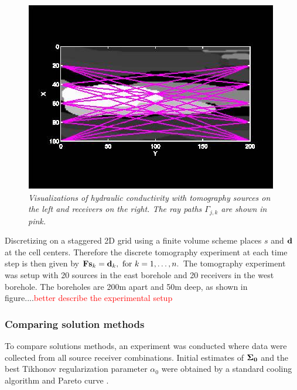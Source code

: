 \documentclass[12pt]{article}
\newcommand {\bfd}   { {\bf d} }
\newcommand {\bfs}   { {\bf s} }
\newcommand{\alert}[1] {\textcolor{red}{#1}}
\newcommand{\bF}  { {\bf F} }      %
\newcommand{\Sigh}{\bf \Sigma}
\begin{document}
\begin{figure}[h!]
	\begin{center}
		\iwidth=80mm
			\includegraphics[width=\iwidth]{figures/tomo.jpg}
	\end{center}
	\caption{{\it Visualizations of hydraulic conductivity with tomography sources on the left and receivers on the right. The ray paths $\Gamma_{j,k}$ are shown in pink.
	}}
	\label{fig:conductivityModels}
\end{figure}
Discretizing on a staggered 2D grid using a finite volume scheme 
places $s$ and ${\bf d}$ at the cell centers. Therefore the discrete tomography experiment at each time step is then given by 
$
 	\bF{\bfs_k} = \bfd_k, \text{ for } k=1,\ldots,n.
$
The tomography experiment was setup with 20 sources in the east borehole and 20 receivers in the west borehole. The boreholes are 200m apart and 50m deep, as shown in figure....\alert{better describe the experimental setup}
 
 
\subsubsection{Comparing solution methods} %
To compare solutions methods, an experiment was conducted where data were collected from all source receiver combinations. Initial estimates of $\Sigh_0$ and the best Tikhonov regularization parameter $\alpha_0$ were obtained by a standard cooling algorithm and Pareto curve . 
\end{document}
